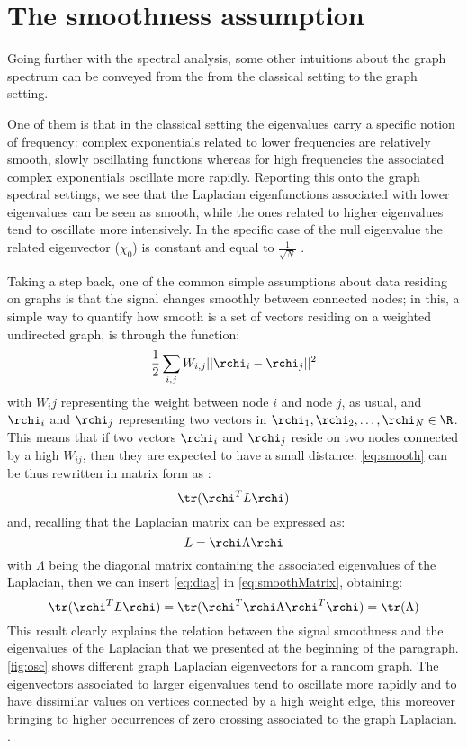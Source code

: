 \chapter{The smoothness assumption}
Going further with the spectral analysis, some other intuitions about the graph spectrum can be conveyed from the from the classical setting to the graph setting.

One of them is that in the classical setting the eigenvalues carry a specific notion of frequency: complex exponentials related to lower frequencies are relatively smooth, slowly oscillating functions whereas for high frequencies the associated complex exponentials oscillate more rapidly. Reporting this onto the graph spectral settings, we see that the Laplacian eigenfunctions associated with lower eigenvalues can be seen as smooth, while the ones related to higher eigenvalues tend to oscillate more intensively. \cite{Shuman2016} In the specific case of the null eigenvalue  the related eigenvector ($\chi_0$) is constant and equal to $\frac{1}{\sqrt{N}}$ \cite{Shuman2013}.

Taking a step back, one of the common simple assumptions about data residing on graphs is that the signal changes smoothly between connected nodes; in this, a simple way to quantify how smooth is a set of vectors residing on a weighted undirected graph, is through the function:
\begin{equation}
\frac{1}{2} \sum_{i,j}W_{i,j}||\rchi_i - \rchi_j||^2
\label{eq:smooth}
\end{equation}
with $W_ij$ representing the weight between node $i$ and node $j$, as usual, and $\rchi_i$ and $\rchi_j$ representing two vectors in $\rchi_1,\rchi_2,\dots,\rchi_N \in \R$. This means that if two vectors $\rchi_i$ and $\rchi_j$ reside on two nodes connected by a high $W_{ij}$, then they are expected to have a small distance. \autoref{eq:smooth} can be thus rewritten in matrix form as \cite{Kalofolias2016} :
\begin{equation}
\tr(\rchi^T L \rchi)
\label{eq:smoothMatrix}
\end{equation} and, recalling that the Laplacian matrix can be expressed as:
\begin{equation}
L = \rchi \Lambda  \rchi
\label{eq:diag}
\end{equation}
with $\Lambda$ being the diagonal matrix containing the associated eigenvalues of the Laplacian, then we can insert \ref{eq:diag} in \ref{eq:smoothMatrix}, obtaining:
\begin{equation}
\tr(\rchi^T L \rchi) = \tr(\rchi^T \rchi \Lambda \rchi^T \rchi) = \tr(\Lambda)
\end{equation}
This result clearly explains the relation between the signal smoothness and the eigenvalues of the Laplacian that we presented at the beginning of the paragraph.\autoref{fig:osc} shows different graph Laplacian eigenvectors for a random graph. The eigenvectors associated to larger eigenvalues tend to oscillate more rapidly and to have dissimilar values on vertices connected by a high weight edge, this moreover bringing to higher occurrences of zero crossing associated to the graph Laplacian. \cite{Shuman2013}.

